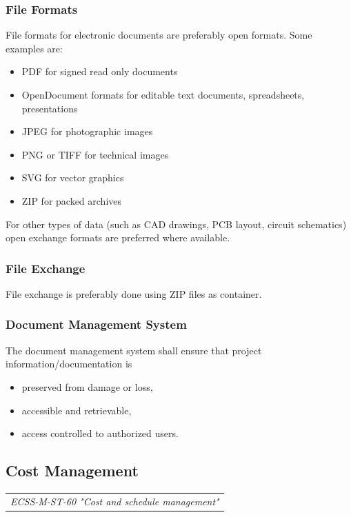 \subsubsection{File Formats}

File formats for electronic documents are preferably open formats. Some examples are:

\begin{itemize}
\item PDF for signed read only documents
\item OpenDocument formats for editable text documents, spreadsheets, presentations
\item JPEG for photographic images
\item PNG or TIFF for technical images
\item SVG for vector graphics
\item ZIP for packed archives
\end{itemize}

For other types of data (such as CAD drawings, PCB layout, circuit schematics) open exchange formats are preferred where available.

\subsubsection{File Exchange}

File exchange is preferably done using ZIP files as container.

\subsubsection{Document Management System}

The document management system shall ensure that project information/documentation is

\begin{itemize}
\item preserved from damage or loss,
\item accessible and retrievable,
\item access controlled to authorized users.
\end{itemize}

\subsection{Cost Management}

\begin{tabular}{l}
\textit{ECSS-M-ST-60 "Cost and schedule management" \cite{ECSS-M-ST-60} }
\end{tabular}

